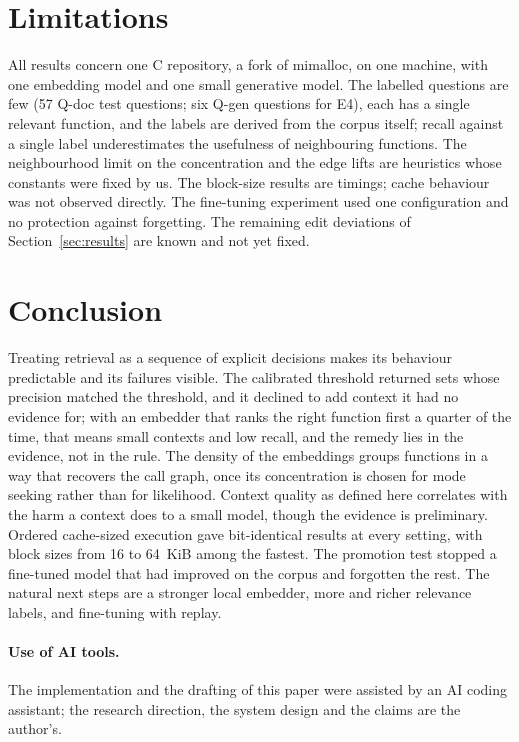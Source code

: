 \documentclass[10pt,twocolumn]{article}
\theoremstyle{definition}
\theoremstyle{remark}
\begin{document}
\section{Limitations}
All results concern one C repository, a fork of mimalloc, on one machine, with one embedding model and one small generative model.
The labelled questions are few (57 Q-doc test questions; six Q-gen questions for E4), each has a single relevant function, and the labels are derived from the corpus itself; recall against a single label underestimates the usefulness of neighbouring functions.
The neighbourhood limit on the concentration and the edge lifts are heuristics whose constants were fixed by us.
The block-size results are timings; cache behaviour was not observed directly.
The fine-tuning experiment used one configuration and no protection against forgetting.
The remaining edit deviations of Section~\ref{sec:results} are known and not yet fixed.

\section{Conclusion}
Treating retrieval as a sequence of explicit decisions makes its behaviour predictable and its failures visible.
The calibrated threshold returned sets whose precision matched the threshold, and it declined to add context it had no evidence for; with an embedder that ranks the right function first a quarter of the time, that means small contexts and low recall, and the remedy lies in the evidence, not in the rule.
The density of the embeddings groups functions in a way that recovers the call graph, once its concentration is chosen for mode seeking rather than for likelihood.
Context quality as defined here correlates with the harm a context does to a small model, though the evidence is preliminary.
Ordered cache-sized execution gave bit-identical results at every setting, with block sizes from 16 to 64~KiB among the fastest.
The promotion test stopped a fine-tuned model that had improved on the corpus and forgotten the rest.
The natural next steps are a stronger local embedder, more and richer relevance labels, and fine-tuning with replay.

\paragraph{Use of AI tools.}
The implementation and the drafting of this paper were assisted by an AI coding assistant; the research direction, the system design and the claims are the author's.



\end{document}
